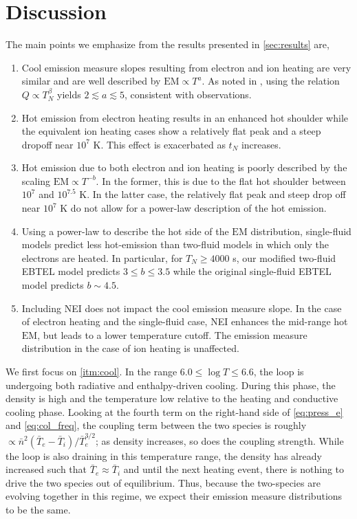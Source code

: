 \documentclass[apj]{emulateapj}
\begin{document}
	\section{Discussion}
	\label{sec:discussion}
	\par The main points we emphasize from the results presented in \autoref{sec:results} are,
	\begin{enumerate}
		\item Cool emission measure slopes resulting from electron and ion heating are very similar and are well described by $\mathrm{EM}\propto T^a$. As noted in \citet{cargill_active_2014}, using the relation $Q\propto T_N^{\beta}$ yields $2\lesssim a\lesssim5$, consistent with observations.\label{itm:cool}
		\item Hot emission from electron heating results in an enhanced hot shoulder while the equivalent ion heating cases show a relatively flat peak and a steep dropoff near $10^7$ K. This effect is exacerbated as $t_N$ increases.\label{itm:hot}
		\item Hot emission due to both electron and ion heating is poorly described by the scaling $\mathrm{EM}\propto T^{-b}$. In the former, this is due to the flat hot shoulder between $10^7$ and $10^{7.5}$ K. In the latter case, the relatively flat peak and steep drop off near $10^7$ K do not allow for a power-law description of the hot emission.\label{itm:deriv}
		\item Using a power-law to describe the hot side of the $\mathrm{EM}$ distribution, single-fluid models predict less hot-emission than two-fluid models in which only the electrons are heated. In particular, for $T_N\ge4000$ s, our modified two-fluid EBTEL model predicts $3\le b\le3.5$ while the original single-fluid EBTEL model predicts $b\sim4.5$.\label{itm:histos}
		\item Including NEI does not impact the cool emission measure slope. In the case of electron heating and the single-fluid case, NEI enhances the mid-range hot $\mathrm{EM}$, but leads to a lower temperature cutoff. The emission measure distribution in the case of ion heating is unaffected. \label{itm:nei}
	\end{enumerate}
	\par We first focus on \autoref{itm:cool}. In the range $6.0\le\log{T}\le6.6$, the loop is undergoing both radiative and enthalpy-driven cooling. During this phase, the density is high and the temperature low relative to the heating and conductive cooling phase. Looking at the fourth term on the right-hand side of \autoref{eq:press_e} and \autoref{eq:col_freq}, the coupling term between the two species is roughly $\propto\bar{n}^2(\bar{T}_e-\bar{T}_i)/\bar{T}_e^{3/2}$; as density increases, so does the coupling strength. While the loop is also draining in this temperature range, the density has already increased such that $\bar{T}_e\approx\bar{T}_i$ and until the next heating event, there is nothing to drive the two species out of equilibrium. Thus, because the two-species are evolving together in this regime, we expect their emission measure distributions to be the same.
\end{document}
